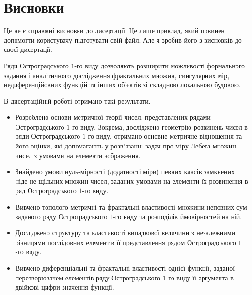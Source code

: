 \chapter*{Висновки}

Це не є справжні висновки до дисертації. Це лише приклад, який
повинен допомогти користувачу підготувати свій файл. Але я зробив
його з висновків до своєї дисертації.

Ряди Остроградського $1$-го виду дозволяють розширити можливості
формального задання і аналітичного дослідження фрактальних множин,
сингулярних мір, недиференційовних функцій та інших об'єктів зі
складною локальною будовою.

В дисертаційній роботі отримано такі результати.
\begin{itemize}
\item Розроблено основи метричної теорії чисел, представлених
рядами Остроградського $1$-го виду. Зокрема, досліджено геометрію
розвинень чисел в ряди Остроградського $1$-го виду, отримано
основне метричне відношення та його оцінки, які допомагають у
розв'язанні задач про міру Лебега множин чисел з умовами на
елементи зображення.

\item Знайдено умови нуль-мірності (додатності міри) певних класів
замкнених ніде не щільних множин чисел, заданих умовами на
елементи їх розвинення в ряд Остроградського $1$-го виду.

\item Вивчено тополого-метричні та фрактальні властивості множини
неповних сум заданого ряду Остроградського $1$-го виду та
розподілів ймовірностей на ній.

\item Досліджено структуру та властивості випадкової величини з
незалежними різницями послідовних елементів її представлення рядом
Остроградського $1$-го виду.

\item Вивчено диференціальні та фрактальні властивості однієї
функції, заданої перетворювачем елементів ряду Остроградського
$1$-го виду її аргумента в двійкові цифри значення функції.
\end{itemize}


